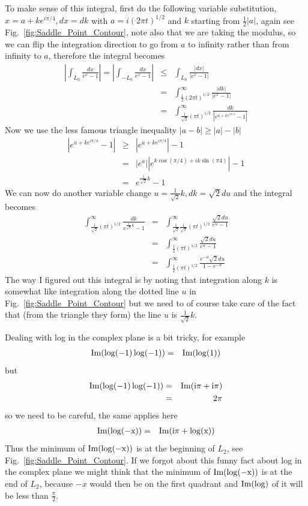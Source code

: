 \documentclass[aps,preprint,preprintnumbers,nofootinbib,showpacs,prd]{revtex4-1}
\newcommand{\nbea}{\begin{eqnarray*}}
\newcommand{\neea}{\end{eqnarray*}}
\def\Im{\rm Im}
\begin{document}
To make sense of this integral, first do the following variable substitution, $x = a + k e^{i\pi/4}, dx = dk$ with $a = i(2\pi t)^{1/2}$ and $k$ starting from $\frac{1}{2} |a|$, again see Fig.~\ref{fig:Saddle_Point_Contour}, note also that we are taking the modulus, so we can flip the integration direction to go from $a$ to infinity rather than from infinity to $a$, therefore the integral becomes
%
\nbea
\left | \int_{L_0} \frac{dx}{e^x - 1} \right | = \left | \int_{-L_0} \frac{dx}{e^x - 1} \right | & \le & \int_{L_0} \frac{|dx|}{|e^x - 1|} \\
& = & \int_{\frac{1}{2}(2\pi t)^{1/2}}^\infty \frac{|dk|}{|e^x - 1|} \\
& = & \int_{\frac{1}{\sqrt{2}}(\pi t)^{1/2}}^\infty \frac{dk}{|e^{a + k e^{i\pi/4}} - 1|}
\neea
%
Now we use the less famous triangle inequality $|a- b| \ge |a| - |b|$
%
\nbea
|e^{a + k e^{i\pi/4}} - 1| & \ge & |e^{a + k e^{i\pi/4}}| - 1 \\
& = & |e^{a}||e^{k \cos (\pi/4) + i k \sin(\pi 4)}| - 1 \\
& = & e^{\frac{1}{\sqrt{2}}k } - 1
\neea
%
We can now do another variable change $u = \frac{1}{\sqrt{2}} k, dk = \sqrt{2} du$ and the integral becomes
%
\nbea
\int_{\frac{1}{\sqrt{2}}(\pi t)^{1/2}}^\infty \frac{dk}{e^{\frac{1}{\sqrt{2}}k } - 1} & = & \int_{\frac{1}{\sqrt{2}}\frac{1}{\sqrt{2}}(\pi t)^{1/2}}^\infty \frac{\sqrt{2} du}{e^{u} - 1} \\
& = & \int_{\frac{1}{2}(\pi t)^{1/2}}^\infty \frac{\sqrt{2} du}{e^{u} - 1} \\
& = & \int_{\frac{1}{2}(\pi t)^{1/2}}^\infty \frac{e^{-u}\sqrt{2} du}{1 - e^{-u}}
\neea
%
The way I figured out this integral is by noting that integration along $k$ is somewhat like integration along the dotted line $u$ in Fig.~\ref{fig:Saddle_Point_Contour} but we need to of course take care of the fact that (from the triangle they form) the line $u$ is $\frac{1}{\sqrt{2}} k$.










Dealing with log in the complex plane is a bit tricky, for example
%
\nbea
\Im{(\log(-1)\log(-1))} & = & \Im{(\log(1))}
\neea
%
but
%
\nbea
\Im{(\log(-1)\log(-1))} & = & \Im{(i\pi + i\pi)} \\
& = & 2\pi
\neea
%
so we need to be careful, the same applies here
%
\nbea
\Im{(\log(-x))} & = & \Im{(i\pi + \log(x))}
\neea
%
Thus the minimum of $\Im{(\log(-x))}$ is at the beginning of $L_2$, see Fig.~\ref{fig:Saddle_Point_Contour}. If we forgot about this funny fact about log in the complex plane we might think that the minimum of $\Im(\log(-x))$ is at the end of $L_2$, because $-x$ would then be on the first quadrant and $\Im{(\log)}$ of it will be less than $\frac{\pi}{2}$. 
\end{document}
